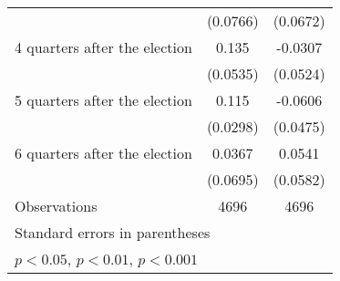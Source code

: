 \begin{table}[htbp]
\begin{tabular}{l*{2}{c}}
                    &    (0.0766)         &    (0.0672)         \\
[1em]
 4 quarters after the election&       0.135\sym{*}  &     -0.0307         \\
                    &    (0.0535)         &    (0.0524)         \\
[1em]
 5 quarters after the election&       0.115\sym{***}&     -0.0606         \\
                    &    (0.0298)         &    (0.0475)         \\
[1em]
 6 quarters after the election&      0.0367         &      0.0541         \\
                    &    (0.0695)         &    (0.0582)         \\
\hline
Observations        &        4696         &        4696         \\
\hline\hline
\multicolumn{3}{l}{\footnotesize Standard errors in parentheses}\\
\multicolumn{3}{l}{\footnotesize \sym{*} \(p<0.05\), \sym{**} \(p<0.01\), \sym{***} \(p<0.001\)}\\
\end{tabular}
\end{table}

